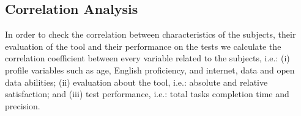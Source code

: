 


\subsection{Correlation Analysis}

In order to check the correlation between characteristics of the subjects, their evaluation of the tool and their performance on the tests we calculate the correlation coefficient between every variable related to the subjects, i.e.: (i) profile variables such as age, English proficiency, and internet, data and open data abilities; (ii) evaluation about the tool, i.e.: absolute and relative satisfaction; and (iii) test performance, i.e.: total tasks completion time and precision.

